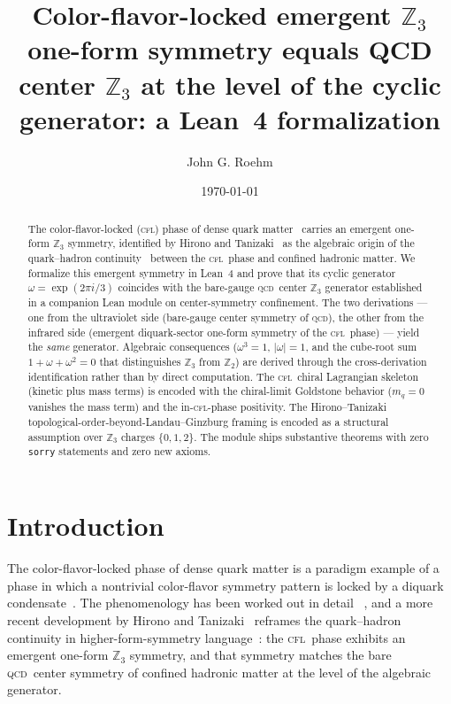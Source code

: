 \documentclass[twocolumn]{revtex4-2}
\newcommand{\CFL}{\textsc{cfl}}
\newcommand{\QCD}{\textsc{qcd}}
\newcommand{\Zthree}{\mathbb{Z}_3}
\begin{document}
\title{Color-flavor-locked emergent $\Zthree$ one-form symmetry equals
QCD center $\Zthree$ at the level of the cyclic generator: a Lean~4
formalization}

\author{John G. Roehm}

\date{\today}

\begin{abstract}
The color-flavor-locked (\CFL) phase of dense quark
matter~\cite{AlfordRajagopalWilczek1999,AlfordSchmittRajagopalSchaefer2008} carries an
emergent one-form $\Zthree$ symmetry, identified by Hirono and
Tanizaki~\cite{HironoTanizaki2018} as the algebraic origin of the
quark--hadron continuity~\cite{SchaeferWilczek1999} between the
\CFL\ phase and confined hadronic matter. We formalize this emergent
symmetry in Lean~4 and prove that its cyclic generator
$\omega = \exp(2\pi i / 3)$ coincides with the bare-gauge \QCD\ center
$\Zthree$ generator established in a companion Lean module on
center-symmetry confinement. The two derivations --- one from the
ultraviolet side (bare-gauge center symmetry of \QCD), the other from
the infrared side (emergent diquark-sector one-form symmetry of the
\CFL\ phase) --- yield the \emph{same} generator. Algebraic consequences
($\omega^3 = 1$, $|\omega| = 1$, and the cube-root sum
$1 + \omega + \omega^2 = 0$ that distinguishes $\Zthree$ from
$\mathbb{Z}_2$) are derived through the cross-derivation
identification rather than by direct computation. The \CFL\ chiral
Lagrangian skeleton (kinetic plus mass terms) is encoded with the
chiral-limit Goldstone behavior ($m_q = 0$ vanishes the mass term) and
the in-\CFL-phase positivity. The Hirono--Tanizaki
topological-order-beyond-Landau--Ginzburg framing is encoded as a
structural assumption over $\Zthree$ charges $\{0, 1, 2\}$. The module
ships \cflThms{} substantive theorems with zero \texttt{sorry} statements
and zero new axioms.
\end{abstract}

\maketitle

\section{Introduction}
\label{sec:intro}

The color-flavor-locked phase of dense quark matter is a paradigm
example of a phase in which a nontrivial color-flavor symmetry pattern
is locked by a diquark condensate~\cite{AlfordRajagopalWilczek1999,
AlfordSchmittRajagopalSchaefer2008}. The phenomenology has been worked out in detail
~\cite{SonStephanov2001,SchaeferWilczek1999}, and a more recent
development by Hirono and Tanizaki~\cite{HironoTanizaki2018} reframes
the quark--hadron continuity in higher-form-symmetry
language~\cite{GaiottoKapustinSeibergWillett2015}: the \CFL\ phase
exhibits an emergent one-form $\Zthree$ symmetry, and that symmetry
matches the bare \QCD\ center symmetry of confined hadronic matter at
the level of the algebraic generator.
\end{document}

